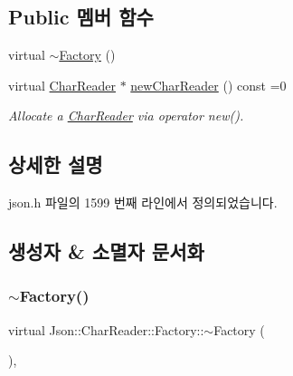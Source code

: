\subsection*{Public 멤버 함수}
\begin{DoxyCompactItemize}
\item 
virtual \hyperlink{class_json_1_1_char_reader_1_1_factory_ae6938f632fa57f88e05818add5bc21be}{$\sim$\+Factory} ()
\item 
virtual \hyperlink{class_json_1_1_char_reader}{Char\+Reader} $\ast$ \hyperlink{class_json_1_1_char_reader_1_1_factory_a4c5862a1ffd432372dbe65cf59de98c4}{new\+Char\+Reader} () const =0
\begin{DoxyCompactList}\small\item\em Allocate a \hyperlink{class_json_1_1_char_reader}{Char\+Reader} via operator new(). \end{DoxyCompactList}\end{DoxyCompactItemize}


\subsection{상세한 설명}


json.\+h 파일의 1599 번째 라인에서 정의되었습니다.



\subsection{생성자 \& 소멸자 문서화}
\mbox{\label{class_json_1_1_char_reader_1_1_factory_ae6938f632fa57f88e05818add5bc21be}} 
\subsubsection{\texorpdfstring{$\sim$\+Factory()}{~Factory()}}
{\footnotesize\ttfamily virtual Json\+::\+Char\+Reader\+::\+Factory\+::$\sim$\+Factory (\begin{DoxyParamCaption}{ }\end{DoxyParamCaption})\hspace{0.3cm}{\ttfamily [inline]}, {\ttfamily [virtual]}}



